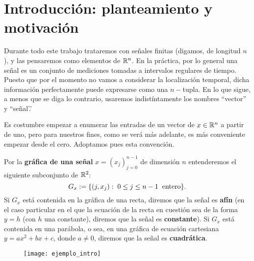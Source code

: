 \chapter{Introducción: planteamiento y motivación}
\label{chapter: introduccion}
Durante todo este trabajo trataremos con señales
finitas
(digamos, de
longitud $n$), y las pensaremos como elementos de $\mathbb{R}^{n}$.
En la práctica, por lo general
una señal es un conjunto de mediciones tomadas
a intervalos regulares de tiempo.
Puesto que por el momento no vamos
a considerar la localización temporal, dicha
información perfectamente puede expresarse como 
una $n-$tupla. En lo que sigue, a menos que se diga
lo contrario, usaremos indistíntamente los nombres
``vector'' y ``señal'.'

Es costumbre empezar
a enumerar las entradas de un vector
de $x \in \mathbb{R}^{n}$ a partir de uno, pero
para nuestros fines,
como se verá más adelante, es más 
conveniente empezar desde el cero.
Adoptamos pues esta convención.


\begin{defi}
\label{def: grafica senial}
Por la \textbf{gráfica de una señal} $x=(x_{j})_{j=0}^{n-1}$
de dimensión $n$ entenderemos
 el siguiente subconjunto de $\mathbb{R}^{2}$:
\[
G_{x} := 
\{ (j, x_{j} ) : \hspace{0.1cm} 0 \leq j \leq n-1
\hspace{0.2cm} \text{entero}\} .
\]
Si $G_{x}$ está contenida en la gráfica de una recta, diremos que la
señal es \textbf{afín}
(en el caso particular en el que
la ecuación de la recta en cuestión sea de la forma $y= h$
(con $h$ una constante),
diremos que la señal es
\textbf{constante}). Si  $G_{x}$ está contenida en 
una parábola, o sea, en una
gráfica de ecuación cartesiana
$y=ax^{2}+ bx +c$, donde $a \neq 0$, diremos 
que la señal es \textbf{cuadrática}.
\end{defi}


\begin{figure}[H]
	\texttt{[image: ejemplo\_intro]} 
 \end{figure}

